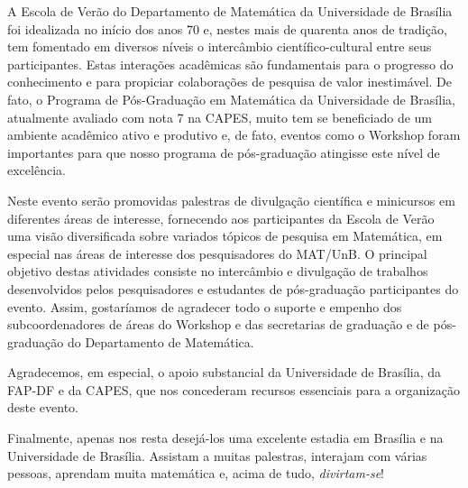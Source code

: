 \vspace{24pt}

A Escola de Ver\~{a}o do Departamento de Matem\'{a}tica da Universidade de Bras\'{i}lia foi idealizada no in\'{i}cio dos anos 70 e, nestes mais de quarenta anos de tradi\c{c}\~{a}o, tem fomentado em diversos n\'{i}veis o interc\^{a}mbio cient\'{i}fico-cultural entre seus participantes. Estas intera\c{c}\~{o}es acad\^{e}micas s\~{a}o fundamentais para o progresso do conhecimento e para propiciar colabora\c{c}\~{o}es de pesquisa de valor inestim\'{a}vel. De fato, o Programa de P\'{o}s-Gradua\c{c}\~{a}o em Matem\'{a}tica da Universidade de Bras\'{i}lia, atualmente avaliado com nota 7 na CAPES, muito tem se beneficiado de um ambiente acad\^{e}mico ativo e produtivo e, de fato, eventos como o Workshop foram importantes para que nosso programa de p\'{o}s-gradua\c{c}\~{a}o atingisse este n\'{i}vel de excel\^{e}ncia.

\vspace{24pt}

Neste evento ser\~{a}o promovidas palestras de divulga\c{c}\~{a}o cient\'{i}fica e minicursos em diferentes \'{a}reas de interesse, fornecendo aos participantes da Escola de Ver\~{a}o uma vis\~{a}o diversificada sobre variados t\'{o}picos de pesquisa em Matem\'{a}tica, em especial nas \'{a}reas de interesse dos pesquisadores do MAT/UnB. O principal objetivo destas atividades consiste no interc\^{a}mbio e divulga\c{c}\~{a}o de trabalhos desenvolvidos pelos pesquisadores e estudantes de p\'{o}s-gradua\c{c}\~{a}o participantes do evento. Assim, gostar\'{i}amos de agradecer todo o suporte e empenho dos subcoordenadores de \'{a}reas do Workshop e das secretarias de gradua\c{c}\~{a}o e de p\'{o}s-gradua\c{c}\~{a}o do Departamento de Matem\'{a}tica. 

\vspace{24pt}

Agradecemos, em especial, o apoio substancial da Universidade de Bras\'{i}lia, da FAP-DF e da CAPES, que nos concederam recursos essenciais para a organiza\c{c}\~{a}o deste evento.

\vspace{24pt}

Finalmente, apenas nos resta desej\'{a}-los uma excelente estadia em Bras\'{i}lia e na Universidade de Bras\'{i}lia. Assistam a muitas palestras, interajam com v\'{a}rias pessoas, aprendam muita matem\'{a}tica e, acima de tudo, \textit{\sc divirtam-se}!

\vspace{24pt}

